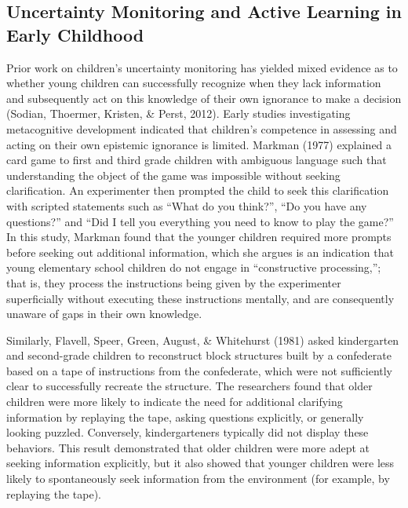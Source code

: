 \documentclass[floatsintext,man]{apa6}
\theoremstyle{definition}
\theoremstyle{definition}
\theoremstyle{definition}
\theoremstyle{remark}
\begin{document}
\subsection{Uncertainty Monitoring and Active Learning in Early
Childhood}\label{uncertainty-monitoring-and-active-learning-in-early-childhood}

Prior work on children's uncertainty monitoring has yielded mixed
evidence as to whether young children can successfully recognize when
they lack information and subsequently act on this knowledge of their
own ignorance to make a decision (Sodian, Thoermer, Kristen, \& Perst,
2012). Early studies investigating metacognitive development indicated
that children's competence in assessing and acting on their own
epistemic ignorance is limited. Markman (1977) explained a card game to
first and third grade children with ambiguous language such that
understanding the object of the game was impossible without seeking
clarification. An experimenter then prompted the child to seek this
clarification with scripted statements such as \enquote{What do you
think?}, \enquote{Do you have any questions?} and \enquote{Did I tell
you everything you need to know to play the game?} In this study,
Markman found that the younger children required more prompts before
seeking out additional information, which she argues is an indication
that young elementary school children do not engage in
\enquote{constructive processing,}; that is, they process the
instructions being given by the experimenter superficially without
executing these instructions mentally, and are consequently unaware of
gaps in their own knowledge.

Similarly, Flavell, Speer, Green, August, \& Whitehurst (1981) asked
kindergarten and second-grade children to reconstruct block structures
built by a confederate based on a tape of instructions from the
confederate, which were not sufficiently clear to successfully recreate
the structure. The researchers found that older children were more
likely to indicate the need for additional clarifying information by
replaying the tape, asking questions explicitly, or generally looking
puzzled. Conversely, kindergarteners typically did not display these
behaviors. This result demonstrated that older children were more adept
at seeking information explicitly, but it also showed that younger
children were less likely to spontaneously seek information from the
environment (for example, by replaying the tape).
\end{document}
